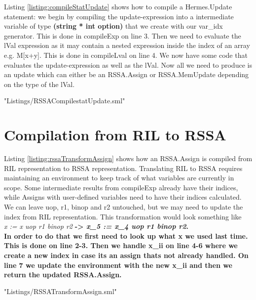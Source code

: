 Listing \ref{listing:compileStatUpdate} shows how to compile a Hermes.Update statement: we begin by compiling the update-expression into a intermediate variable of type \textbf{(string * int option)} that we create with our var\_idx generator. This is done in compileExp on line 3. Then we need to evaluate the lVal expression as it may contain a nested expression inside the index of an array e.g. M[x+y]. This is done in compileLval on line 4.
We now have some code that evaluates the update-expression as well as the lVal. Now all we need to produce is an update which can either be an RSSA.Assign or RSSA.MemUpdate depending on the type of the lVal.

 {"Listings/RSSACompilestatUpdate.sml"}


\section{Compilation from RIL to RSSA}
Listing \ref{listing:rssaTransformAssign} shows how an RSSA.Assign is compiled from RIL representation to RSSA representation. Translating RIL to RSSA requires maintaining an environment to keep track of what variables are currently in scope. Some intermediate results from compileExp already have their indices, while Assigns with user-defined variables need to have their indices calculated. We can leave uop, r1, binop and r2 untouched, but we may need to update the index from RIL representation. This transformation would look something like \\
\emph{x := x uop r1 binop r2} \bf{->} \emph{x\_5 := x\_4 uop r1 binop r2}. \\
In order to do that we first need to look up what x we used last time. This is done on line 2-3. Then we handle x\_ii on line 4-6 where we create a new index in case its an assign thats not already handled. On line 7 we update the environment with the new x\_ii and then we return the updated RSSA.Assign.

 {"Listings/RSSATransformAssign.sml"}

